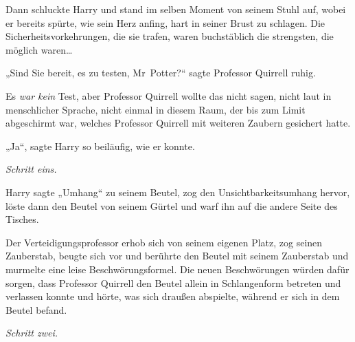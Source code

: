Dann schluckte Harry und stand im selben Moment von seinem Stuhl auf, wobei er bereits spürte, wie sein Herz anfing, hart in seiner Brust zu schlagen. Die Sicherheitsvorkehrungen, die sie trafen, waren buchstäblich die strengsten, die möglich waren…

„Sind Sie bereit, es zu testen, Mr~Potter?“ sagte Professor Quirrell ruhig.

Es \emph{war kein} Test, aber Professor Quirrell wollte das nicht sagen, nicht laut in menschlicher Sprache, nicht einmal in diesem Raum, der bis zum Limit abgeschirmt war, welches Professor Quirrell mit weiteren Zaubern gesichert hatte.

„Ja“, sagte Harry so beiläufig, wie er konnte.

\emph{Schritt eins.}

Harry sagte „Umhang“ zu seinem Beutel, zog den Unsichtbarkeitsumhang hervor, löste dann den Beutel von seinem Gürtel und warf ihn auf die andere Seite des Tisches.

Der Verteidigungsprofessor erhob sich von seinem eigenen Platz, zog seinen Zauberstab, beugte sich vor und berührte den Beutel mit seinem Zauberstab und murmelte eine leise Beschwörungsformel. Die neuen Beschwörungen würden dafür sorgen, dass Professor Quirrell den Beutel allein in Schlangenform betreten und verlassen konnte und hörte, was sich draußen abspielte, während er sich in dem Beutel befand.

\emph{Schritt zwei.}

